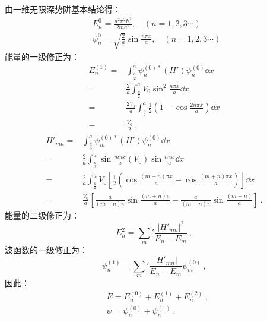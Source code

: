 \subsection{ }
由一维无限深势阱基本结论得：\\
\begin{equation}
\begin{aligned}
& E^{0}_{n} = \frac{n^{2} \pi^{2} \hbar^{2}}{2ma^{2}},\quad (n = 1,2,3\cdots) \\
& \psi^{0}_{n} = \sqrt{\frac{2}{a}} \sin{\frac{n \pi x}{a}},\quad (n = 1,2,3\cdots)
\end{aligned}~
\end{equation}
能量的一级修正为：\\
\begin{equation}
\begin{aligned}
E^{(1)}_{n} =& \int^{a}_{\frac{a}{2}} \psi^{(0)*}_{n} (H') \psi^{(0)}_{n} \dd{x} \\
=& \frac{2}{a} \int^{a}_{\frac{a}{2}} V_{0} \sin^{2}{\frac{n \pi x}{a}} \dd{x} \\
=& \frac{2V_{0}}{a} \int^{a}_{\frac{a}{2}} \frac{1}{2} (1-\cos{\frac{2n \pi x}{a}}) \dd{x} \\
=& \frac{V_{0}}{2}~,
\end{aligned}
\end{equation}
\begin{equation}
\begin{aligned}
H'_{mn} =& \int^{a}_{\frac{a}{2}} \psi^{(0)*}_{m}(H') \psi^{(0)}_{n} \dd{x} \\
=& \frac{2}{a} \int^{a}_{\frac{a}{2}} \sin{\frac{m \pi x}{a}} (V_{0}) \sin{\frac{n \pi x}{a}} \dd{x} \\
=& \frac{2}{a} \int^{a}_{\frac{a}{2}} V_{0} \left[ \frac{1}{2} (\cos{\frac{(m-n) \pi x}{a}} - \cos{\frac{(m+n) \pi x}{a}}) \right] \dd{x} \\
=& \frac{V_{0}}{a} \left[ \frac{a}{(m+n)\pi} \sin{\frac{(m+n)\pi}{a}} - \frac{a}{(m-n)\pi} \sin{\frac{(m-n)}{a}} \right]~.
\end{aligned}
\end{equation}
能量的二级修正为：\\
\begin{equation}
E^{2}_{n} = \sum_{m}' \frac{\left| H'_{mn} \right|^{2}}{E_{n} - E_{m}}~,
\end{equation}
波函数的一级修正为：\\
\begin{equation}
\psi^{(1)}_{n} = \sum_{m}' \frac{\left| H'_{mn} \right|}{E_{n} - E_{m}} \psi^{(0)}_{m}~,
\end{equation}
因此：\\
\begin{equation}
\begin{aligned}
& E = E^{(0)}_{n} + E^{(1)}_{n} + E^{(2)}_{n}~, \\
& \psi = \psi^{(0)}_{n} + \psi^{(1)}_{n}~.
\end{aligned}
\end{equation}


